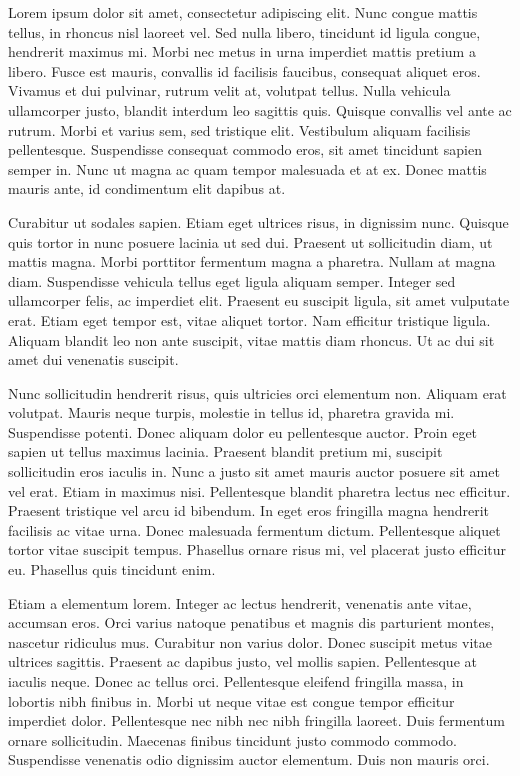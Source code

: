 \documentclass[a4paper,12pt,twoside]{ThesisStyle}
\begin{document}
Lorem ipsum dolor sit amet, consectetur adipiscing elit. Nunc congue mattis tellus, in rhoncus nisl laoreet vel. Sed nulla libero, tincidunt id ligula congue, hendrerit maximus mi. Morbi nec metus in urna imperdiet mattis pretium a libero. Fusce est mauris, convallis id facilisis faucibus, consequat aliquet eros. Vivamus et dui pulvinar, rutrum velit at, volutpat tellus. Nulla vehicula ullamcorper justo, blandit interdum leo sagittis quis. Quisque convallis vel ante ac rutrum. Morbi et varius sem, sed tristique elit. Vestibulum aliquam facilisis pellentesque. Suspendisse consequat commodo eros, sit amet tincidunt sapien semper in. Nunc ut magna ac quam tempor malesuada et at ex. Donec mattis mauris ante, id condimentum elit dapibus at.

Curabitur ut sodales sapien. Etiam eget ultrices risus, in dignissim nunc. Quisque quis tortor in nunc posuere lacinia ut sed dui. Praesent ut sollicitudin diam, ut mattis magna. Morbi porttitor fermentum magna a pharetra. Nullam at magna diam. Suspendisse vehicula tellus eget ligula aliquam semper. Integer sed ullamcorper felis, ac imperdiet elit. Praesent eu suscipit ligula, sit amet vulputate erat. Etiam eget tempor est, vitae aliquet tortor. Nam efficitur tristique ligula. Aliquam blandit leo non ante suscipit, vitae mattis diam rhoncus. Ut ac dui sit amet dui venenatis suscipit.

Nunc sollicitudin hendrerit risus, quis ultricies orci elementum non. Aliquam erat volutpat. Mauris neque turpis, molestie in tellus id, pharetra gravida mi. Suspendisse potenti. Donec aliquam dolor eu pellentesque auctor. Proin eget sapien ut tellus maximus lacinia. Praesent blandit pretium mi, suscipit sollicitudin eros iaculis in. Nunc a justo sit amet mauris auctor posuere sit amet vel erat. Etiam in maximus nisi. Pellentesque blandit pharetra lectus nec efficitur. Praesent tristique vel arcu id bibendum. In eget eros fringilla magna hendrerit facilisis ac vitae urna. Donec malesuada fermentum dictum. Pellentesque aliquet tortor vitae suscipit tempus. Phasellus ornare risus mi, vel placerat justo efficitur eu. Phasellus quis tincidunt enim.

Etiam a elementum lorem. Integer ac lectus hendrerit, venenatis ante vitae, accumsan eros. Orci varius natoque penatibus et magnis dis parturient montes, nascetur ridiculus mus. Curabitur non varius dolor. Donec suscipit metus vitae ultrices sagittis. Praesent ac dapibus justo, vel mollis sapien. Pellentesque at iaculis neque. Donec ac tellus orci. Pellentesque eleifend fringilla massa, in lobortis nibh finibus in. Morbi ut neque vitae est congue tempor efficitur imperdiet dolor. Pellentesque nec nibh nec nibh fringilla laoreet. Duis fermentum ornare sollicitudin. Maecenas finibus tincidunt justo commodo commodo. Suspendisse venenatis odio dignissim auctor elementum. Duis non mauris orci.
\end{document}
